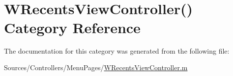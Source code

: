 \hypertarget{category_w_recents_view_controller_07_08}{\section{W\-Recents\-View\-Controller() Category Reference}
\label{category_w_recents_view_controller_07_08}
}


The documentation for this category was generated from the following file\-:\begin{DoxyCompactItemize}
\item 
Sources/\-Controllers/\-Menu\-Pages/\hyperlink{_w_recents_view_controller_8m}{W\-Recents\-View\-Controller.\-m}\end{DoxyCompactItemize}

